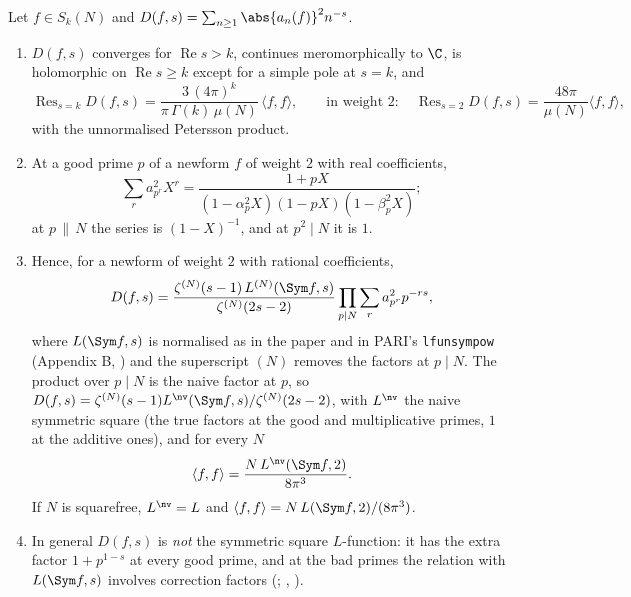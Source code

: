 \begin{theorem}\label{thm:hecke:rankin-selberg}
Let $f\in S_k(N)$ and $D(f,s)=\sum_{n\ge1}\abs{a_n(f)}^2n^{-s}$.
\begin{enumerate}[label=(\roman*)]
\item $D(f,s)$ converges for $\operatorname{Re}s>k$, continues meromorphically to $\C$, is holomorphic on $\operatorname{Re}s\ge k$ except for a simple pole at $s=k$, and
\[
\operatorname{Res}_{s=k}D(f,s)=\frac{3\,(4\pi)^k}{\pi\,\Gamma(k)\,\mu(N)}\,\langle f,f\rangle,\qquad\text{in weight }2:\quad\operatorname{Res}_{s=2}D(f,s)=\frac{48\pi}{\mu(N)}\langle f,f\rangle,
\]
with the unnormalised Petersson product.
\item At a good prime $p$ of a newform $f$ of weight $2$ with real coefficients,
\[
\sum_ra_{p^r}^2X^r=\frac{1+pX}{(1-\alpha_p^2X)(1-pX)(1-\beta_p^2X)};
\]
at $p\,\|\,N$ the series is $(1-X)^{-1}$, and at $p^2\mid N$ it is $1$.
\item Hence, for a newform of weight $2$ with rational coefficients,
\[
D(f,s)=\frac{\zeta^{(N)}(s-1)\,L^{(N)}(\Sym f,s)}{\zeta^{(N)}(2s-2)}\prod_{p\mid N}\sum_ra_{p^r}^2p^{-rs},
\]
where $L(\Sym f,s)$ is
normalised as in the paper and in PARI's \texttt{lfunsympow} (Appendix B, ) and the superscript $(N)$ removes the factors at $p\mid N$. The product over $p\mid N$ is the
naive factor at $p$, so $D(f,s)=\zeta^{(N)}(s-1)L^{\nv}(\Sym f,s)/\zeta^{(N)}(2s-2)$, with $L^{\nv}$ the naive symmetric square (the true factors at the good and multiplicative primes, $1$ at
the additive ones), and for every $N$
\[
\langle f,f\rangle=\frac{N\,L^{\nv}(\Sym f,2)}{8\pi^3}.
\]
If $N$ is squarefree, $L^{\nv}=L$ and $\langle f,f\rangle=N\,L(\Sym f,2)/(8\pi^3)$.
\item In general $D(f,s)$ is \emph{not} the symmetric square $L$-function: it has the extra factor $1+p^{1-s}$ at every good prime, and at the bad primes the relation with $L(\Sym f,s)$
involves correction factors (; \cite[Lemma 2.12]{DFG04}, \cite{Shimura76}).
\end{enumerate}
\end{theorem}

